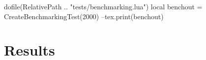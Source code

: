 \documentclass[oneside]{memoir}
\begin{document}
\pagestyle{empty}

\begin{luacode*}
	dofile(RelativePath .. "tests/benchmarking.lua")
	local benchout = CreateBenchmarkingTest(2000)
	--tex.print(benchout)
\end{luacode*}

\chapter{Results}

\PrintRpgTexErrors

\PrintRpgTexBenchmarking
\end{document}
